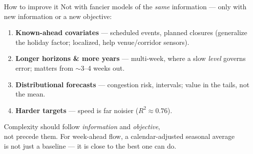 \documentclass[aspectratio=169,11pt]{beamer}
\begin{document}
\begin{frame}{How to improve it}
  Not with fancier models of the \emph{same} information --- only with new
  information or a new objective:
  \vfill
  \begin{enumerate}
    \item \textbf{Known-ahead covariates} --- scheduled events, planned closures
      (generalize the holiday factor; localized, help venue/corridor sensors).
    \item \textbf{Longer horizons \& more years} --- multi-week, where a slow
      \emph{level} governs error; matters from $\sim$3--4 weeks out.
    \item \textbf{Distributional forecasts} --- congestion risk, intervals; value
      in the tails, not the mean.
    \item \textbf{Harder targets} --- speed is far noisier ($R^2 \approx 0.76$).
  \end{enumerate}
\end{frame}

\begin{frame}[standout]
  Complexity should follow \emph{information} and \emph{objective},\\
  not precede them.
  \vfill
  \normalsize For week-ahead flow, a calendar-adjusted seasonal average\\
  is not just a baseline --- it is close to the best one can do.
\end{frame}
\end{document}
